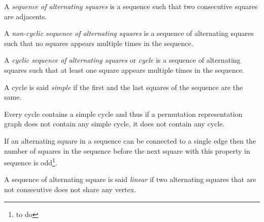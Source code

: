 \begin{definition}
  A \textit{sequence of alternating squares} is a sequence such that two consecutive squares are adjacents.
\end{definition}

\begin{definition}
  A \textit{non-cyclic sequence of alternating squares} is a sequence of alternating squares such that no squares appears multiple times in the sequence.
\end{definition}

\begin{definition}
  A \textit{cyclic sequence of alternating squares} or \textit{cycle} is a sequence of alternating squares such that at least one square appears multiple times in the sequence.
\end{definition}

\begin{definition}
  A cycle is said \textit{simple} if the first and the last squares of the sequence are the same.
\end{definition}

\begin{corollary}
  \label{cycle-simple-cycle}
  Every cycle contains a simple cycle and thus if a permutation representation graph does not contain any simple cycle, it does not contain any cycle.
\end{corollary}

\begin{proposition}
  \label{parity-sequence-squares}
  If an alternating square in a sequence can be connected to a single edge then the number of squares in the sequence before the next square with this property in sequence is odd\footnote{to do}.
\end{proposition}

\begin{definition}
    A sequence of alternating square is said \textit{linear} if two alternating squares that are not consecutive does not share any vertex.
\end{definition}

